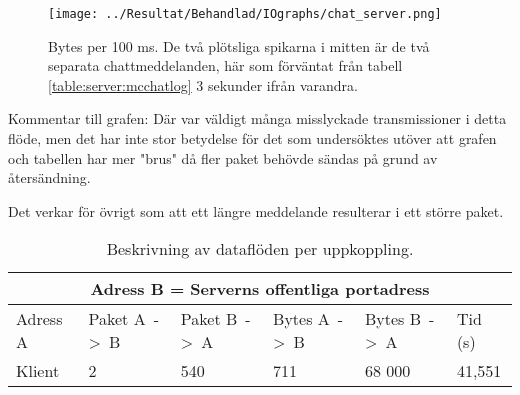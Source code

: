 \documentclass[journal,comsoc]{IEEEtran}
\begin{document}
\begin{figure} [H]
  \centering
  \texttt{[image: ../Resultat/Behandlad/IOgraphs/chat\_server.png]}
  \caption{Bytes per 100 ms. De två plötsliga spikarna i mitten är de två separata chattmeddelanden, här som förväntat från tabell \ref{table:server:mcchatlog} 3 sekunder ifrån varandra.}
  \label{fig:server:mcchat}
\end{figure}
Kommentar till grafen: Där var väldigt många misslyckade transmissioner i detta flöde, men det har inte stor betydelse för det som undersöktes utöver att grafen och tabellen har mer "brus" då fler paket behövde sändas på grund av återsändning.

Det verkar för övrigt som att ett längre meddelande resulterar i ett större paket. 
\begin{table} [H]
  \begin{center}
    \label{table:server:mcchat}
    \begin{tabular}{ | m{1.5cm} |  m{1cm} | m{1cm}| m{1cm}|m{1cm}|m{0.75cm}| } 
      \hline
      \multicolumn{6}{|c|}{Adress B = Serverns offentliga portadress} \\
      \hline
      Adress A & Paket A~->~B & Paket B~->~A & Bytes A~->~B & Bytes B~->~A & Tid (s) \\
      \hline
      Klient & 2 & 540 & 711 & 68 000 & 41,551 \\
      \hline 
    \end{tabular}
  \end{center}
  \caption{Beskrivning av dataflöden per uppkoppling.}
\end{table}
\end{document}
